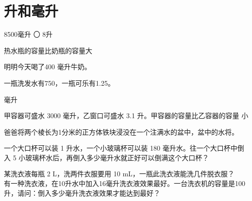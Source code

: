 
\section{升和毫升}


8500毫升 〇 8升



\xiaoti 热水瓶的容量比奶瓶的容量大 \hfill \parentheses

\xiaoti 明明今天喝了400 毫升牛奶。 \hfill \parentheses


\xiaoti 一瓶洗发水有750\parentheses，一瓶可乐有1.25\parentheses。

  {毫升}

\xiaoti 甲容器可盛水 3000 毫升，乙窗口可盛水 3.1 升。甲容器的容量比乙容器的容量\parentheses
  {小}

\xiaoti 爸爸将两个棱长为1分米的正方体铁块浸没在一个注满水的盆中，盆中的水将\parentheses。


\xiaoti 一个大口杯可以装 1 升水，一个小玻璃杯可以装 180 毫升水。往一个大口杯中倒入 5 小玻璃杯水后，再倒入多少毫升水就正好可以倒满这个大口杯？\\[20mm]



\xiaoti 某洗衣液每瓶 2 L，洗两件衣服要用 10 mL，一瓶此洗衣液能洗几件脱衣服？\\[20mm]

\xiaoti 有一种洗衣液，在10升水中加入16毫升洗衣液效果最好。一台洗衣机的容量是100升，请问：倒入多少毫升洗衣液效果才能达到最好？\\[20mm]



